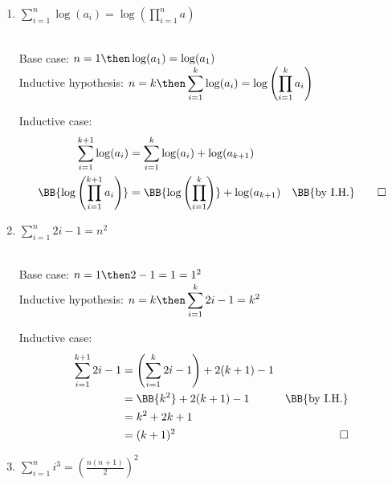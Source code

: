 \documentclass[basic, header]{nosvagor-notes}
\begin{document}
\begin{enumerate}[itemsep=4em]
\begin{enumerate}[leftmargin=2em, itemsep=8em]
      \item \(\displaystyle \sum_{i=1}^{n} \log(a_i) = \log \left( \prod_{i=1}^{n} a \right) \)

        \\
        Base case: \(n=1 \then \log(a_1) = \log(a_1)\) \\
        Inductive hypothesis: \(\displaystyle n= k
        \then
        \sum_{i=1}^{k} \log(a_i) = \log\left( \prod_{i=1}^{k} a_i  \right) \)

        Inductive case:
        \begin{align*}
         \sum_{i=1}^{k+1} \log(a_i)
         &= \sum_{i=1}^{k} \log(a_i) + \log(a_{k+1} )\\
         \BB{ \log\left(\prod_{i=1}^{k+1} a_i \right)}
         &= \BB{\log\left( \prod_{i=1}^{k} \right)} + \log(a_{k+1} )
         & \text{\BB{by I.H.}} \qed \\
        \end{align*}


      \item \(\displaystyle \sum_{i=1}^{n} 2i - 1 = n^2 \)

        \\
        Base case: \(n = 1 \then 2 - 1 = 1 = 1^2\) \\
        Inductive hypothesis: \(\displaystyle
        n = k \then
        \sum_{i=1}^{k} 2i - 1 = k^2\)

        Inductive case:
        \begin{align*}
          \sum_{i=1}^{k+1} 2i - 1
          &= \left( \sum_{i=1}^{k} 2i - 1 \right)  + 2(k + 1) - 1\\
          &= \BB{k^2} + 2(k+1) -1 & \text{\BB{by I.H.}} \\
          &= k^2 + 2k + 1 \\
          &= (k+1)^2 & \qed
        \end{align*}

  \newpage %

      \item \(\displaystyle \sum_{i=1}^{n} i^3 = \left( \frac{n(n+1)}{2} \right)^2 \)


\end{enumerate}
\end{enumerate}
\end{document}
